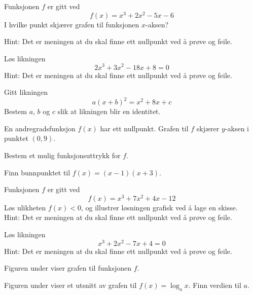 \newpage
{} \vso
{}

Funksjonen $ f $ er gitt ved
\[ f(x)=x^3+2x^2-5x-6\]
I hvilke punkt skjærer grafen til funksjonen $ x $-aksen?  \os

{\footnotesize Hint: Det er meningen at du skal finne ett nullpunkt ved å prøve og feile.}

Løs likningen
\[ 2x^3+3x^2-18x+8=0 \]
{\footnotesize Hint: Det er meningen at du skal finne ett nullpunkt ved å prøve og feile.}	

Gitt likningen
\[ a(x+b)^2=x^2+8x+c \]
Bestem $a$, $b$ og $c$ slik at likningen blir en identitet.

En andregradsfunksjon $f(x)$ har ett nullpunkt. Grafen til $f$ skjærer $y$-aksen
i punktet $(0, 9)$.\os 

Bestem et mulig funksjonsuttrykk for $f$.


Finn bunnpunktet til $f(x)=(x-1)(x+3)$.

Funksjonen $f$ er gitt ved
\[ f(x)=x^3+7x^2+4x-12 \]
Løs ulikheten $f(x)<0$, og illustrer løsningen grafisk ved å lage en skisse. \\
{\footnotesize Hint: Det er meningen at du skal finne ett nullpunkt ved å prøve og feile.}

Løs likningen 
\[ x^3+2x^2-7x+4=0 \]
{\footnotesize Hint: Det er meningen at du skal finne ett nullpunkt ved å prøve og feile.}

\newpage
{}
Figuren under viser grafen til funksjonen $f$.

Figuren under viser et utsnitt av grafen til $f(x)=\log_{a} x$. Finn verdien til $a$.


